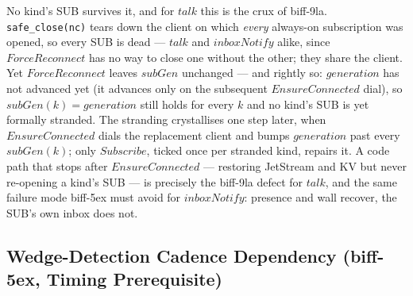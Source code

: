 \documentclass[a4paper,10pt,fleqn]{article}
\begin{document}
No kind's SUB survives it, and for $talk$ this is the crux of biff-9la.
\texttt{safe\_close(nc)} tears down the client on which \emph{every}
always-on subscription was opened, so every SUB is dead --- $talk$ and
$inboxNotify$ alike, since $ForceReconnect$ has no way to close one
without the other; they share the client.  Yet $ForceReconnect$ leaves
$subGen$ unchanged --- and rightly so: $generation$ has not advanced yet
(it advances only on the subsequent $EnsureConnected$ dial), so
$subGen(k) = generation$ still holds for every $k$ and no kind's SUB is
yet formally stranded.  The stranding crystallises one step later, when
$EnsureConnected$ dials the replacement client and bumps $generation$ past
every $subGen(k)$; only $Subscribe$, ticked once per stranded kind,
repairs it.  A code path that stops after $EnsureConnected$ --- restoring
JetStream and KV but never re-opening a kind's SUB --- is precisely the
biff-9la defect for $talk$, and the same failure mode biff-5ex must avoid
for $inboxNotify$: presence and wall recover, the SUB's own inbox does
not.

\subsection{Wedge-Detection Cadence Dependency (biff-5ex, Timing
Prerequisite)}
\label{sec:cadence}
\end{document}
